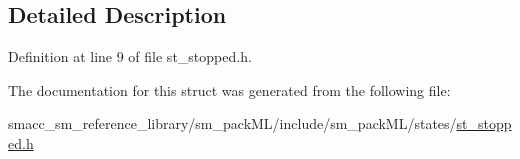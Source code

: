 \subsection{Detailed Description}


Definition at line 9 of file st\+\_\+stopped.\+h.



The documentation for this struct was generated from the following file\+:\begin{DoxyCompactItemize}
\item 
smacc\+\_\+sm\+\_\+reference\+\_\+library/sm\+\_\+pack\+M\+L/include/sm\+\_\+pack\+M\+L/states/\hyperlink{st__stopped_8h}{st\+\_\+stopped.\+h}\end{DoxyCompactItemize}
